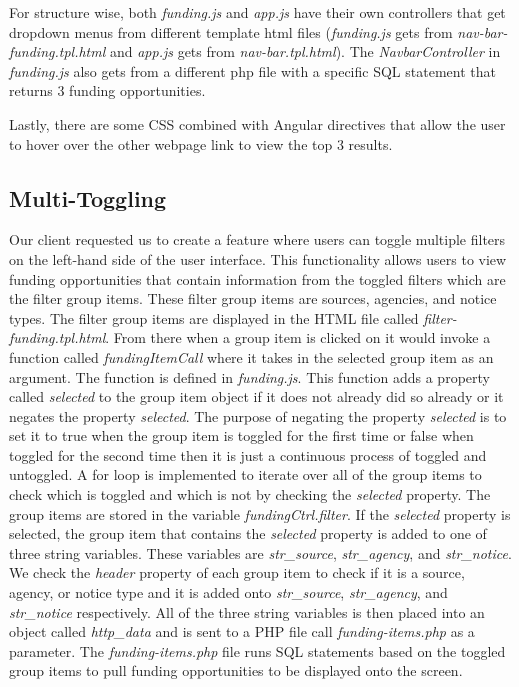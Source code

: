 \documentclass[onecolumn]{IEEEtran}
\begin{document}
For structure wise, both \textit{funding.js} and \textit{app.js} have their own controllers that get dropdown menus from different template html files (\textit{funding.js} gets from \textit{nav-bar-funding.tpl.html} and \textit{app.js} gets from \textit{nav-bar.tpl.html}). The \textit{NavbarController} in \textit{funding.js} also gets from a different php file with a specific SQL statement that returns 3 funding opportunities. 

Lastly, there are some CSS combined with Angular directives that allow the user to hover over the other webpage link to view the top 3 results.


\subsection{Multi-Toggling}
Our client requested us to create a feature where users can toggle multiple filters on the left-hand side of the user interface. This functionality allows users to view funding opportunities that contain information from the toggled filters which are the filter group items. These filter group items are sources, agencies, and notice types. The filter group items are displayed in the HTML file called \textit{filter-funding.tpl.html}. From there when a group item is clicked on it would invoke a function called \textit{fundingItemCall} where it takes in the selected group item as an argument. The function is defined in \textit{funding.js}. This function adds a property called \textit{selected} to the group item object if it does not already did so already or it negates the property \textit{selected}. The purpose of negating the property \textit{selected} is to set it to true when the group item is toggled for the first time or false when toggled for the second time then it is just a continuous process of toggled and untoggled. A for loop is implemented to iterate over all of the group items to check which is toggled and which is not by checking the \textit{selected} property. The group items are stored in the variable \textit{fundingCtrl.filter}. If the \textit{selected} property is selected, the group item that contains the \textit{selected} property is added to one of three string variables. These variables are \textit{str_source}, \textit{str_agency}, and \textit{str_notice}. We check the \textit{header} property of each group item to check if it is a source, agency, or notice type and it is added onto \textit{str_source}, \textit{str_agency}, and \textit{str_notice} respectively. All of the three string variables is then placed into an object called \textit{http_data} and is sent to a PHP file call \textit{funding-items.php} as a parameter. The \textit{funding-items.php} file runs SQL statements based on the toggled group items to pull funding opportunities to be displayed onto the screen. 
\end{document}
